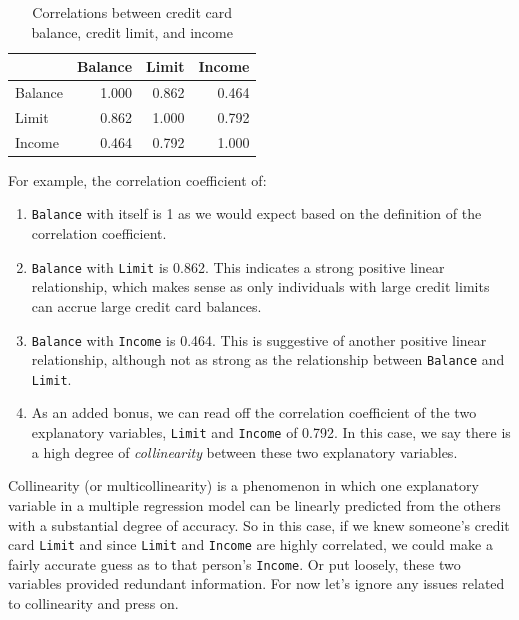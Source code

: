 \documentclass[12pt, krantz2,]{krantz}
\makeatletter
\newenvironment{Shaded}{\begin{snugshade}}{\end{snugshade}}
\newcommand{\KeywordTok}[1]{\textcolor[rgb]{0.27,0.27,0.27}{\textbf{#1}}}
\newcommand{\NormalTok}[1]{#1}
\newcommand{\OperatorTok}[1]{\textcolor[rgb]{0.43,0.43,0.43}{\textbf{#1}}}
\newcommand{\StringTok}[1]{\textcolor[rgb]{0.5,0.5,0.5}{#1}}
\providecommand{\tightlist}{%
  \setlength{\itemsep}{0pt}\setlength{\parskip}{0pt}}
\newenvironment{kframe}{%
\medskip{}
\setlength{\fboxsep}{.8em}
 \def\at@end@of@kframe{}%
 \ifinner\ifhmode%
  \def\at@end@of@kframe{\end{minipage}}%
  \begin{minipage}{\columnwidth}%
 \fi\fi%
 \def\FrameCommand##1{\hskip\@totalleftmargin \hskip-\fboxsep
 \colorbox{shadecolor}{##1}\hskip-\fboxsep
     \hskip-\linewidth \hskip-\@totalleftmargin \hskip\columnwidth}%
 \MakeFramed {\advance\hsize-\width
   \@totalleftmargin\z@ \linewidth\hsize
   \@setminipage}}%
 {\par\unskip\endMakeFramed%
 \at@end@of@kframe}
\renewenvironment{Shaded}{\begin{kframe}}{\end{kframe}}
\makeatother
\begin{document}
\begin{Shaded}
\end{Shaded}

\begin{table}[H]

\caption{\label{tab:model3-correlation}Correlations between credit card balance, credit limit, and income}
\centering
\fontsize{10}{12}\selectfont
\begin{tabular}{lrrr}
\toprule
  & Balance & Limit & Income\\
\midrule
Balance & 1.000 & 0.862 & 0.464\\
Limit & 0.862 & 1.000 & 0.792\\
Income & 0.464 & 0.792 & 1.000\\
\bottomrule
\end{tabular}
\end{table}

For example, the correlation coefficient of:

\begin{enumerate}
\def\labelenumi{\arabic{enumi}.}
\tightlist
\item
  \texttt{Balance} with itself is 1 as we would expect based on the definition of the correlation coefficient.
\item
  \texttt{Balance} with \texttt{Limit} is 0.862. This indicates a strong positive linear relationship, which makes sense as only individuals with large credit limits can accrue large credit card balances.
\item
  \texttt{Balance} with \texttt{Income} is 0.464. This is suggestive of another positive linear relationship, although not as strong as the relationship between \texttt{Balance} and \texttt{Limit}.
\item
  As an added bonus, we can read off the correlation coefficient of the two explanatory variables, \texttt{Limit} and \texttt{Income} of 0.792. In this case, we say there is a high degree of \emph{collinearity} between these two explanatory variables.
\end{enumerate}

Collinearity (or multicollinearity) is a phenomenon in which one explanatory variable in a multiple regression model can be linearly predicted from the others with a substantial degree of accuracy. So in this case, if we knew someone's credit card \texttt{Limit} and since \texttt{Limit} and \texttt{Income} are highly correlated, we could make a fairly accurate guess as to that person's \texttt{Income}. Or put loosely, these two variables provided redundant information. For now let's ignore any issues related to collinearity and press on.
\end{document}
